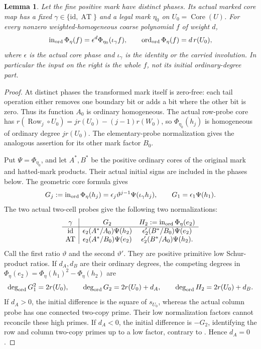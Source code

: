 \documentclass[11pt,a4paper]{amsart}
\numberwithin{equation}{section}
\theoremstyle{plain}
\newtheorem{lemma}[theorem]{Lemma}
\theoremstyle{definition}
\newcommand{\AT}{\operatorname{AT}}
\newcommand{\Row}{\operatorname{Row}}
\newcommand{\ord}{\operatorname{ord}}
\newcommand{\Core}{\operatorname{Core}}
\begin{document}
\begin{lemma}\label{lem:distinct-leading}
Let the fine positive mark have distinct phases.  Its actual marked core
map has a fixed \(\gamma\in\{\mathrm{id},\AT\}\) and a legal mark \(\eta_0\)
on \(U_0=\Core(U)\).  For every nonzero weighted-homogeneous coarse polynomial
\(f\) of weight \(d\),
\begin{equation}\label{eq:distinct-leading}
 \operatorname{in}_{\rm ord}\Phi_\eta(f)
   =\epsilon^d\Phi_{\eta_0}(\iota_\gamma f),\qquad
 \ord_{\rm ord}\Phi_\eta(f)=d\,r(U_0),
\end{equation}
where \(\epsilon\) is the actual core phase and \(\iota_\gamma\) is the
identity or the carried involution.  In particular the input on the right
is the whole \(f\), not its initial ordinary-degree part.
\end{lemma}
\begin{proof}
At distinct phases the transformed mark itself is zero-free: each tail
operation either removes one boundary bit or adds a bit where the other
bit is zero.  Thus its function \(A_0\) is ordinary homogeneous.  The actual
row-probe core has \(r(\Row_j\circ U_0)=j r(U_0)-(j-1)r(W_0)\),
so \(\Phi_{\eta_0}(h_j)\) is homogeneous of ordinary degree \(j r(U_0)\).
The elementary-probe normalization gives the analogous assertion for its
other mark factor \(B_0\).

Put \(\Psi=\Phi_{\eta_0}\), and let \(A^*,B^*\) be the positive ordinary
cores of the original mark and hatted-mark products.  Their actual
initial signs are included in the phases below.
The geometric core formula gives
\[
 G_j:=\operatorname{in}_{\rm ord}\Phi_\eta(h_j)
   =\epsilon_j\vartheta^{j-1}\Psi(\iota_\gamma h_j),
 \qquad G_1=\epsilon_1\Psi(h_1).
\]
The two actual two-cell probes give the following two normalizations:
\[
 \begin{array}{c|cc}
 \gamma&G_2&
 H_2:=\operatorname{in}_{\rm ord}\Phi_\eta(e_2)\\ \hline
 \mathrm{id}&\epsilon_2(A^*/A_0)\Psi(h_2)&
             \epsilon'_2(B^*/B_0)\Psi(e_2)\\
 \AT&\epsilon_2(A^*/B_0)\Psi(e_2)&
       \epsilon'_2(B^*/A_0)\Psi(h_2).
 \end{array}
\]
Call the first ratio \(\vartheta\) and the second \(\vartheta'\).
They are positive primitive low Schur-product ratios.
If \(d_A,d_B\) are their ordinary degrees, the competing degrees in
\(\Phi_\eta(e_2)=\Phi_\eta(h_1)^2-\Phi_\eta(h_2)\) are
\[
 \deg_{\rm ord}G_1^2=2r(U_0),\qquad
 \deg_{\rm ord}G_2=2r(U_0)+d_A,\qquad
 \deg_{\rm ord}H_2=2r(U_0)+d_B.
\]
If \(d_A>0\), the initial difference is the square of \(s_{U_0}\),
whereas the actual column probe has one connected two-copy prime.
Their low normalization factors cannot reconcile these high primes.
If \(d_A<0\), the initial difference is \(-G_2\), identifying the row
and column two-copy primes up to a low factor, contrary to
.  Hence \(d_A=0\).


\end{proof}
\end{document}
